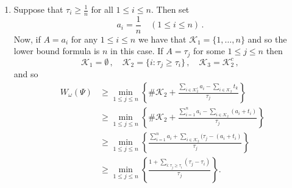 \documentclass{amsart}
\theoremstyle{definition}
\newcommand{\0}{\mbf 0}%
\newcommand{\cK}{\mathcal{K}}
\DeclareMathOperator{\dimh}{\dim_H}
\begin{document}
\begin{enumerate}
    \item[i.] Suppose that $\tau_{i}\geq \frac{1}{n}$ for all $1\leq i \leq n$. Then set
    \begin{equation*}
        a_{i}=\frac{1}{n} \quad (1\leq i \leq n)\, .
    \end{equation*}
    Now, if $A=a_{i}$ for any $1\leq i \leq n$ we have that $\cK_{1}=\{1,\dots, n\}$ and so the lower bound formula is $n$ in this case. If $A=\tau_{j}$ for some $1\leq j \leq n$ then
    \begin{equation*}
        \cK_{1}=\emptyset \, , \quad \cK_{2}=\{ i : \tau_{j} \geq \tau_{i}\}\, , \quad \cK_{3}=\cK_{2}^{c}\, ,
    \end{equation*}
    and so
    \begin{align*}
        \dimh W_{\omega}(\Psi)&\geq \min_{1\leq j \leq n}\left\{ \# \cK_{2}+\frac{\sum_{i \in \cK_{2}^{c}} a_{i} -\sum_{i\in \cK_{2}} t_{k}}{\tau_{j}} \right\} \\
        &\geq \min_{1\leq j \leq n}\left\{ \# \cK_{2}+\frac{\sum_{i =1}^{n} a_{i} -\sum_{i\in \cK_{2}} (a_{i}+t_{i})}{\tau_{j}} \right\} \\
        &\geq \min_{1\leq j \leq n}\left\{ \frac{\sum_{i =1}^{n} a_{i} +\sum_{i\in \cK_{2}} (\tau_{j}-(a_{i}+t_{i})}{\tau_{j}} \right\} \\
         &\geq \min_{1\leq j \leq n}\left\{ \frac{1 +\sum_{i:\tau_{j}\geq \tau_{i}} (\tau_{j}-\tau_{i})}{\tau_{j}} \right\}. \\
    \end{align*}


\end{enumerate}
\end{document}
